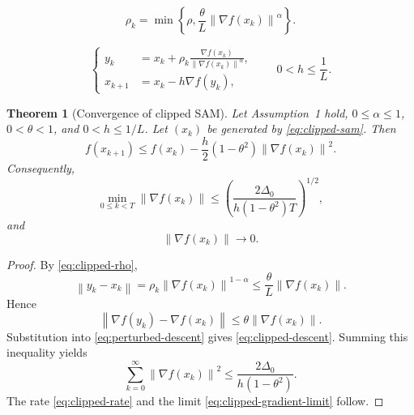 \documentclass[10pt,a4paper]{amsart}
\newtheorem{theorem}{Theorem}
\newcommand{\norm}[1]{\left\lVert #1\right\rVert}
\begin{document}
\begin{equation}\label{eq:clipped-rho}
  \rho_k=
  \min\left\{
       \rho,\frac{\theta}{L}
       \norm{\nabla f(x_k)}^\alpha
      \right\}.
\end{equation}

\begin{equation}\label{eq:clipped-sam}
\left\{
\begin{aligned}
 y_k&=x_k+\rho_k
 \frac{\nabla f(x_k)}{\norm{\nabla f(x_k)}^\alpha},\\
 x_{k+1}&=x_k-h\nabla f(y_k),
\end{aligned}
\right.
\qquad 0<h\leq\frac1L.
\end{equation}

\begin{theorem}[Convergence of clipped SAM]\label{thm:clipped}
Let Assumption~1 hold, $0\leq\alpha\leq1$, $0<\theta<1$, and
$0<h\leq1/L$.  Let $(x_k)$ be generated by \eqref{eq:clipped-sam}.
Then
\begin{equation}\label{eq:clipped-descent}
 f(x_{k+1})
 \leq f(x_k)
 -\frac h2(1-\theta^2)\norm{\nabla f(x_k)}^2.
\end{equation}
Consequently,
\begin{equation}\label{eq:clipped-rate}
 \min_{0\leq k<T}\norm{\nabla f(x_k)}
 \leq
 \left(
 \frac{2\Delta_0}{h(1-\theta^2)T}
 \right)^{1/2},
\end{equation}
and
\begin{equation}\label{eq:clipped-gradient-limit}
  \norm{\nabla f(x_k)}\longrightarrow0.
\end{equation}
\end{theorem}

\begin{proof}
By \eqref{eq:clipped-rho},
$$
 \norm{y_k-x_k}
 =\rho_k\norm{\nabla f(x_k)}^{1-\alpha}
 \leq\frac{\theta}{L}\norm{\nabla f(x_k)}.
$$
Hence
$$
 \norm{\nabla f(y_k)-\nabla f(x_k)}
 \leq\theta\norm{\nabla f(x_k)}.
$$
Substitution into \eqref{eq:perturbed-descent} gives
\eqref{eq:clipped-descent}.  Summing this inequality yields
$$
 \sum_{k=0}^{\infty}\norm{\nabla f(x_k)}^2
 \leq\frac{2\Delta_0}{h(1-\theta^2)}.
$$
The rate \eqref{eq:clipped-rate} and the limit
\eqref{eq:clipped-gradient-limit} follow.
\end{proof}
\end{document}
